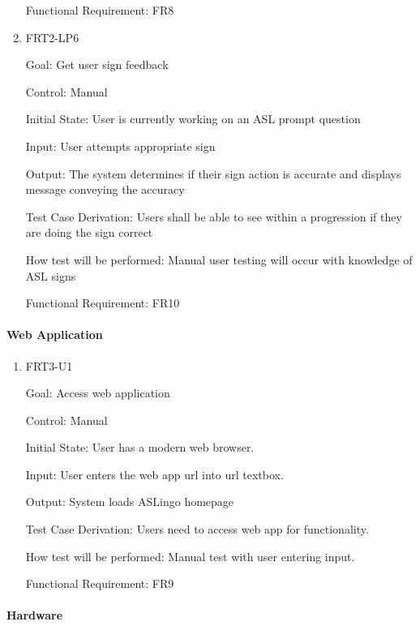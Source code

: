\documentclass[12pt, titlepage]{article}
\begin{document}
\begin{enumerate}
Functional Requirement: FR8

\item{FRT2-LP6}

Goal: Get user sign feedback

Control: Manual
					
Initial State: User is currently working on an ASL prompt question

Input: User attempts appropriate sign
					
Output: The system determines if their sign action is accurate and displays message conveying the accuracy

Test Case Derivation: Users shall be able to see within a progression if they are doing the sign correct
					
How test will be performed: Manual user testing will occur with knowledge of ASL signs

Functional Requirement: FR10

\end{enumerate}

\paragraph{Web Application}

\begin{enumerate}

\item{FRT3-U1}

Goal: Access web application

Control: Manual
					
Initial State: User has a modern web browser.
					
Input: User enters the web app url into url textbox.
					
Output: System loads ASLingo homepage

Test Case Derivation: Users need to access web app for functionality.
					
How test will be performed: Manual test with user entering input.

Functional Requirement: FR9

\end{enumerate}

\paragraph{Hardware}
\end{document}
